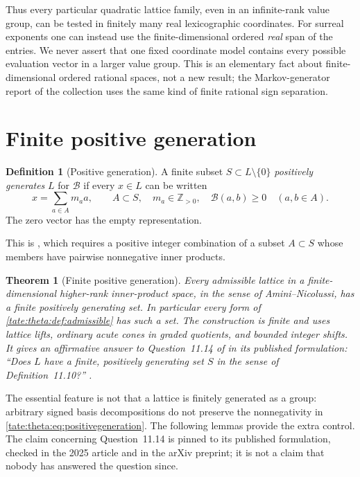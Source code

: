 \documentclass[11pt,letterpaper]{article}
\newtheorem{theorem}{Theorem}[section]
\theoremstyle{definition}
\newtheorem{definition}[definition]{Definition}
\newcommand{\Z}{\mathbb Z}
\newcommand{\cB}{\mathcal B}
\begin{document}
Thus every particular quadratic lattice family, even in an infinite-rank
value group, can be tested in finitely many real lexicographic coordinates.
For surreal exponents one can instead use the finite-dimensional ordered
\emph{real} span of the entries. We never assert that one fixed coordinate
model contains every possible evaluation vector in a larger value group.
This is an elementary fact about finite-dimensional ordered rational spaces,
not a new result; the Markov-generator report of the collection uses the
same kind of finite rational sign separation.

\section{Finite positive generation}\label{tate:theta:sec:positive}

\begin{definition}[Positive generation]\label{tate:theta:def:posgen}
A finite subset $S\subset L\setminus\{0\}$ \emph{positively generates} $L$
for $\cB$ if every $x\in L$ can be written
\begin{equation}
 x=\sum_{a\in A}m_aa,\qquad
 A\subset S,\quad m_a\in\Z_{>0},\quad \cB(a,b)\ge0\quad(a,b\in A).
 \label{tate:theta:eq:positivegeneration}
\end{equation}
The zero vector has the empty representation.
\end{definition}

This is \cite[Definition~11.10]{AN}, which requires a positive integer
combination of a subset $A\subset S$ whose members have pairwise
nonnegative inner products.

\begin{theorem}[Finite positive generation]\label{tate:theta:thm:positive}
Every admissible lattice in a finite-dimensional higher-rank inner-product
space, in the sense of Amini--Nicolussi, has a finite positively generating
set. In particular every form of \cref{tate:theta:def:admissible} has such a
set. The construction is finite and uses lattice lifts, ordinary acute
cones in graded quotients, and bounded integer shifts. It gives an
affirmative answer to Question~11.14 of \cite{AN} in its published
formulation: ``Does $L$ have a finite, positively generating set $S$ in the
sense of Definition~11.10?'' \cite[\S11.5.3, p.~1181]{AN}.
\end{theorem}

The essential feature is not that a lattice is finitely generated as a
group: arbitrary signed basis decompositions do not preserve the
nonnegativity in \eqref{tate:theta:eq:positivegeneration}. The following
lemmas provide the extra control. The claim concerning Question~11.14 is
pinned to its published formulation, checked in the 2025 article and in the
arXiv preprint; it is not a claim that nobody has answered the question
since.
\end{document}
